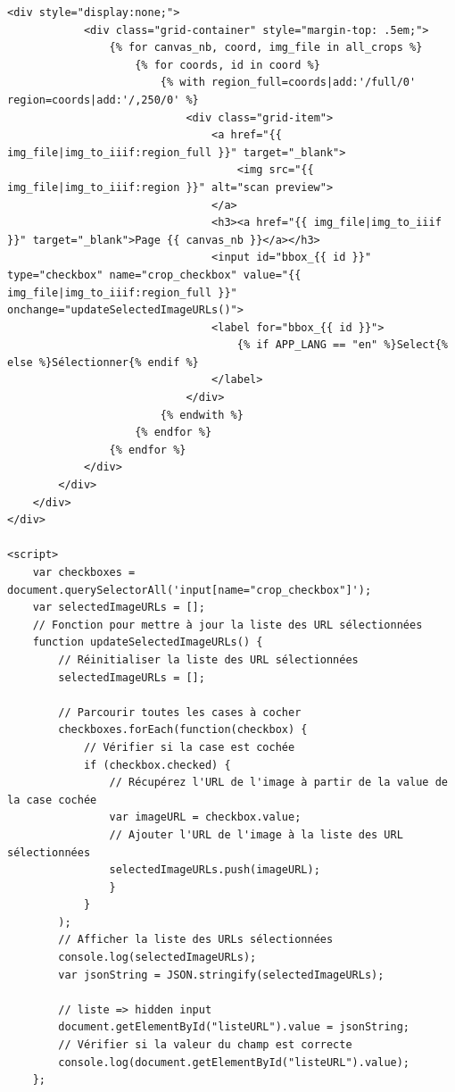 \begin{lstlisting}[language=HTML5, frame=single, breaklines=true, caption={Template \html pour l'affichage des crops de diagrammes.}]
        <div style="display:none;">
            <div class="grid-container" style="margin-top: .5em;">
                {% for canvas_nb, coord, img_file in all_crops %}
                    {% for coords, id in coord %}
                        {% with region_full=coords|add:'/full/0' region=coords|add:'/,250/0' %}
                            <div class="grid-item">
                                <a href="{{ img_file|img_to_iiif:region_full }}" target="_blank">
                                    <img src="{{ img_file|img_to_iiif:region }}" alt="scan preview">
                                </a>
                                <h3><a href="{{ img_file|img_to_iiif }}" target="_blank">Page {{ canvas_nb }}</a></h3>
                                <input id="bbox_{{ id }}" type="checkbox" name="crop_checkbox" value="{{ img_file|img_to_iiif:region_full }}" onchange="updateSelectedImageURLs()">
                                <label for="bbox_{{ id }}">
                                    {% if APP_LANG == "en" %}Select{% else %}Sélectionner{% endif %}
                                </label>
                            </div>
                        {% endwith %}
                    {% endfor %}
                {% endfor %}
            </div>
        </div>
    </div>
</div>

<script>
    var checkboxes = document.querySelectorAll('input[name="crop_checkbox"]');
    var selectedImageURLs = [];
    // Fonction pour mettre à jour la liste des URL sélectionnées
    function updateSelectedImageURLs() {
        // Réinitialiser la liste des URL sélectionnées
        selectedImageURLs = [];

        // Parcourir toutes les cases à cocher
        checkboxes.forEach(function(checkbox) {
            // Vérifier si la case est cochée
            if (checkbox.checked) {
                // Récupérez l'URL de l'image à partir de la value de la case cochée
                var imageURL = checkbox.value;
                // Ajouter l'URL de l'image à la liste des URL sélectionnées
                selectedImageURLs.push(imageURL);
                }
            }
        );
        // Afficher la liste des URLs sélectionnées
        console.log(selectedImageURLs);
        var jsonString = JSON.stringify(selectedImageURLs);

        // liste => hidden input
        document.getElementById("listeURL").value = jsonString;
        // Vérifier si la valeur du champ est correcte
        console.log(document.getElementById("listeURL").value);
    };


\end{lstlisting}
